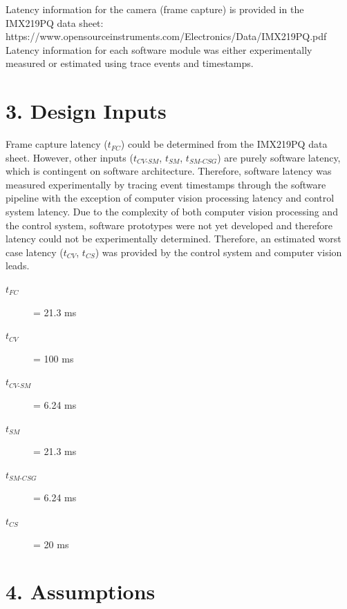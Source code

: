 \documentclass[11pt]{article}
\begin{document}
Latency information for the camera (frame capture) is provided in the IMX219PQ data sheet: \\
https://www.opensourceinstruments.com/Electronics/Data/IMX219PQ.pdf\\
Latency information for each software module was either experimentally measured or estimated using trace events and timestamps.

\vspace{1em}

\section*{3. Design Inputs}


Frame capture latency ($t_{FC}$) could be determined from the IMX219PQ data sheet. However, other inputs ($t_{CV\text{-}SM}$, $t_{SM}$, $t_{SM\text{-}CSG}$) are purely software latency,
which is contingent on software architecture. Therefore, software latency was measured experimentally by tracing event timestamps through the software pipeline with the exception of computer vision processing latency and control system latency.
Due to the complexity of both computer vision processing and the control system, software prototypes were not yet developed and therefore latency 
could not be experimentally determined. Therefore, an estimated worst case latency ($t_{CV}$, $t_{CS}$) was provided by the control system and computer vision leads. 

\begin{description}%
    \item[$t_{FC}$] = 21.3 ms
    \item[$t_{CV}$] = 100 ms
    \item[$t_{CV\text{-}SM}$] = 6.24 ms
    \item[$t_{SM}$] = 21.3 ms
    \item[$t_{SM\text{-}CSG}$] = 6.24 ms
    \item[$t_{CS}$] = 20 ms
\end{description}



\vspace{1em}

\section*{4. Assumptions}
\end{document}
